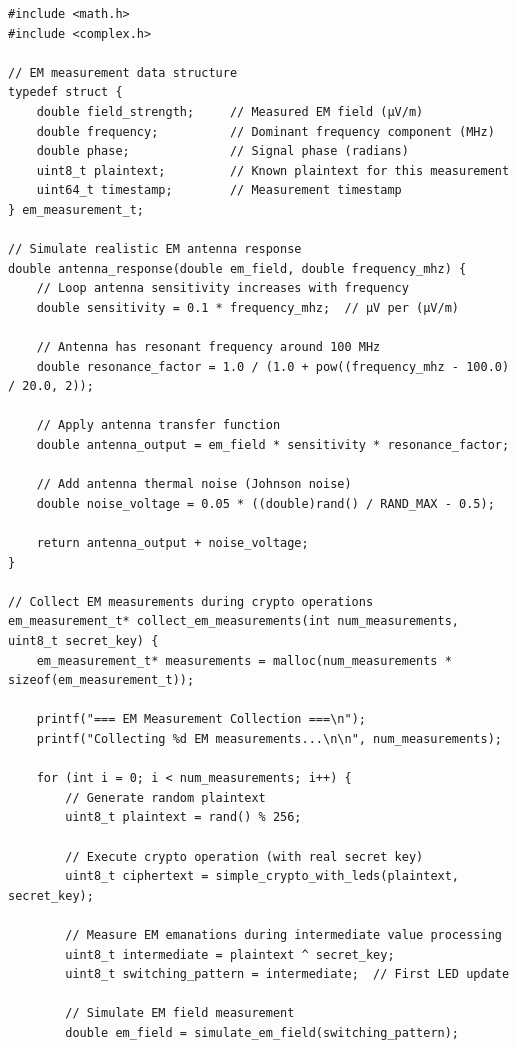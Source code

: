 \documentclass[11pt,a4paper]{article}
\theoremstyle{definition}
\begin{document}
\begin{lstlisting}[caption={EM Measurement Infrastructure}]
#include <math.h>
#include <complex.h>

// EM measurement data structure
typedef struct {
    double field_strength;     // Measured EM field (μV/m)
    double frequency;          // Dominant frequency component (MHz)
    double phase;              // Signal phase (radians)
    uint8_t plaintext;         // Known plaintext for this measurement
    uint64_t timestamp;        // Measurement timestamp
} em_measurement_t;

// Simulate realistic EM antenna response
double antenna_response(double em_field, double frequency_mhz) {
    // Loop antenna sensitivity increases with frequency
    double sensitivity = 0.1 * frequency_mhz;  // μV per (μV/m)
    
    // Antenna has resonant frequency around 100 MHz
    double resonance_factor = 1.0 / (1.0 + pow((frequency_mhz - 100.0) / 20.0, 2));
    
    // Apply antenna transfer function
    double antenna_output = em_field * sensitivity * resonance_factor;
    
    // Add antenna thermal noise (Johnson noise)
    double noise_voltage = 0.05 * ((double)rand() / RAND_MAX - 0.5);
    
    return antenna_output + noise_voltage;
}

// Collect EM measurements during crypto operations
em_measurement_t* collect_em_measurements(int num_measurements, uint8_t secret_key) {
    em_measurement_t* measurements = malloc(num_measurements * sizeof(em_measurement_t));
    
    printf("=== EM Measurement Collection ===\n");
    printf("Collecting %d EM measurements...\n\n", num_measurements);
    
    for (int i = 0; i < num_measurements; i++) {
        // Generate random plaintext
        uint8_t plaintext = rand() % 256;
        
        // Execute crypto operation (with real secret key)
        uint8_t ciphertext = simple_crypto_with_leds(plaintext, secret_key);
        
        // Measure EM emanations during intermediate value processing
        uint8_t intermediate = plaintext ^ secret_key;
        uint8_t switching_pattern = intermediate;  // First LED update
        
        // Simulate EM field measurement
        double em_field = simulate_em_field(switching_pattern);
        

\end{lstlisting}
\end{document}
